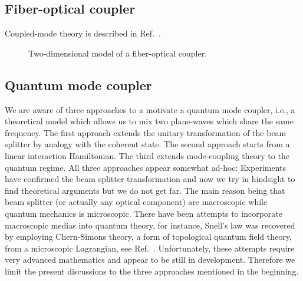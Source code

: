 \FloatBarrier
\subsection{Fiber-optical coupler}

Coupled-mode theory is described in Ref.~\cite[p.~359]{Luks2009}.
\begin{figure}[htb]
	\centering
	
	\caption{Two-dimensional model of a fiber-optical coupler.}\label{fig:fiber_coupler}
\end{figure}

\FloatBarrier
\subsection{Quantum mode coupler}



We are aware of three approaches to a motivate a quantum mode coupler, i.e., a theoretical model which allows us to mix two plane-waves which share the same frequency.
The first approach extends the unitary transformation of the beam splitter by analogy with the coherent state.
The second approach starts from a linear interaction Hamiltonian.
The third extends mode-coupling theory to the quantum regime.
All three approaches appear somewhat ad-hoc:
Experiments have confirmed the beam splitter transformation and now we try in hindsight to find theoretical arguments but we do not get far.
The main reason being that beam splitter (or actually any optical component) are macroscopic while quantum mechanics is microscopic.
There have been attempts to incorporate macroscopic medias into quantum theory, for instance, Snell's law was recovered by employing Chern-Simons theory, a form of topological quantum field theory, from a microscopic Lagrangian, see Ref.~\cite{Pismak2014}.
Unfortunately, these attempts require very advanced mathematics and appear to be still in development.
Therefore we limit the present discussions to the three approaches mentioned in the beginning.

